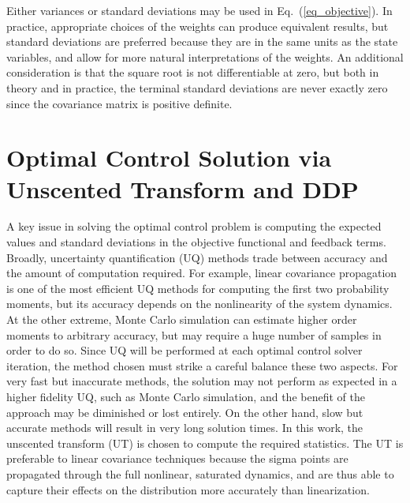 \documentclass[journal ]{new-aiaa}
\newcommand{\state}{\ensuremath{\mathbf{x}}}
\newcommand{\ur}{\ensuremath{u_{\mathrm{ref}}}}
\newcommand{\E}[1]{\mathbb{E}\left[#1\right]}
\newcommand{\V}[1]{\mathbb{V}[#1]}
\newcommand{\cov}{C}
\begin{document}
Either variances or standard deviations may be used in Eq.~(\ref{eq_objective}). In practice, appropriate choices of the weights can produce equivalent results, but standard deviations are preferred because they are in the same units as the state variables, and allow for more natural interpretations of the weights. An additional consideration is that the square root is not differentiable at zero, but both in theory and in practice, the terminal standard deviations are never exactly zero since the covariance matrix is positive definite.

\section*{Optimal Control Solution via Unscented Transform and DDP}
A key issue in solving the optimal control problem is computing the expected values and standard deviations in the objective functional and feedback terms. Broadly, uncertainty quantification (UQ) methods trade between accuracy and the amount of computation required. For example, linear covariance propagation is one of the most efficient UQ methods for computing the first two probability moments, but its accuracy depends on the nonlinearity of the system dynamics. At the other extreme, Monte Carlo simulation can estimate higher order moments to arbitrary accuracy, but may require a huge number of samples in order to do so. Since UQ will be performed at each optimal control solver iteration, the method chosen must strike a careful balance these two aspects. For very fast but inaccurate methods, the solution may not perform as expected in a higher fidelity UQ, such as Monte Carlo simulation, and the benefit of the approach may be diminished or lost entirely. On the other hand, slow but accurate methods will result in very long solution times. In this work, the unscented transform (UT) \cite{UT1997} is chosen to compute the required statistics. The UT is preferable to linear covariance techniques because the sigma points are propagated through the full nonlinear, saturated dynamics, and are thus able to capture their effects on the distribution more accurately than linearization. 
\end{document}
